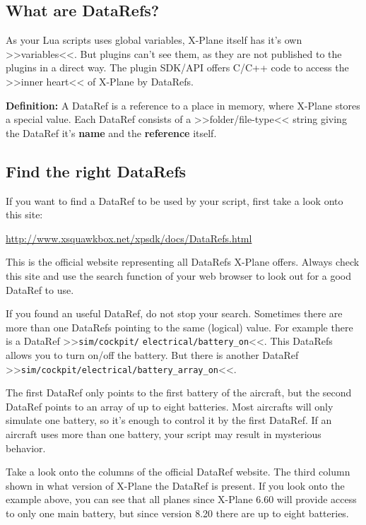 \documentclass[11pt,parskip=half,a4paper]{scrartcl}
\begin{document}
\subsection{What are DataRefs?}

As your Lua scripts uses global variables, X-Plane itself has it's own >>variables<<. But plugins can't see them, as they are not published to the plugins in a direct way. The plugin SDK/API offers C/C++ code to access the >>inner heart<< of X-Plane by DataRefs.

\vspace{2ex}

\textbf{Definition:} A DataRef is a reference to a place in memory, where X-Plane stores a special value. Each DataRef consists of a >>folder/file-type<< string giving the DataRef it's \textbf{name} and the \textbf{reference} itself.

\vspace{2ex}

\subsection{Find the right DataRefs}

If you want to find a DataRef to be used by your script, first take a look onto this site:

\url{http://www.xsquawkbox.net/xpsdk/docs/DataRefs.html}

This is the official website representing all DataRefs X-Plane offers. Always check this site and use the search function of your web browser to look out for a good DataRef to use.

If you found an useful DataRef, do not stop your search. Sometimes there are more than one DataRefs pointing to the same (logical) value. For example there is a DataRef >>\verb|sim/cockpit/| \verb|electrical/battery_on|<<. This DataRefs allows you to turn on/off the battery. But there is another DataRef >>\verb|sim/cockpit/electrical/battery_array_on|<<.

The first DataRef only points to the first battery of the aircraft, but the second DataRef points to an array of up to eight batteries. Most aircrafts will only simulate one battery, so it's enough to control it by the first DataRef. If an aircraft uses more than one battery, your script may result in mysterious behavior.

Take a look onto the columns of the official DataRef website. The third column shown in what version of X-Plane the DataRef is present. If you look onto the example above, you can see that all planes since X-Plane 6.60 will provide access to only one main battery, but since version 8.20 there are up to eight batteries.
\end{document}

